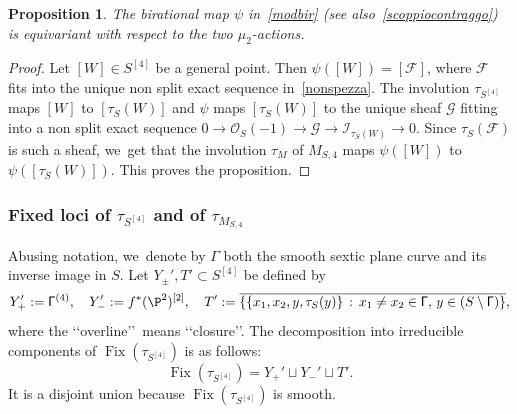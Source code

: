 \documentclass[JEP,XML,SOM,Unicode,published]{cedram}
\newcommand\cF{\mathcal{F}}
\newcommand\cG{\mathcal{G}}
\newcommand\cI{\mathcal{I}}
\newcommand\cO{\mathcal{O}}
\DeclareMathOperator{\Fix}{Fix}
\let\ov\overline
\newtheorem{prop}[lemm]{Proposition}
\theoremstyle{definition}
\begin{document}
\begin{prop}\label{prop:azionicompat}
The birational map $\psi$ in~\eqref{modbir} (see also~\eqref{scoppiocontraggo}) is equivariant with respect to the two $\mu_2$-actions.
\end{prop}

\begin{proof}
Let $[W]\in S^{[4]}$ be a general point. Then $\psi([W])=[\cF]$, where $\cF$ fits into the unique non split exact sequence in~\eqref{nonspezza}. The involution $\tau_{S^{[4]}}$ maps $[W]$ to $[\tau_S(W)]$ and $\psi$ maps $[\tau_S(W)]$ to the unique sheaf $\cG$ fitting into a non split exact sequence $0\to\cO_S(-1)\to\cG\to \cI_{\tau_S(W)}\to 0$. Since $\tau_S(\cF)$ is such a sheaf, we~get that the involution $\tau_M$ of $M_{S,4}$ maps $\psi([W])$ to $\psi([\tau_S(W)])$. This proves the proposition.
\end{proof}

\subsubsection*{Fixed loci of $\tau_{S^{[4]}}$ and of $\tau_{M_{S,4}}$}

Abusing notation, we~denote by $\mathsf{\Gamma}$ both the smooth sextic plane curve and its inverse image in $S$.
Let $Y_{\pm}',T'\subset S^{[4]}$ be defined by
\begin{equation*}
Y_+':=\mathsf{\Gamma}^{(4)},\quad Y_-':=f^*(\P^2)^{[2]},\quad
T':=\ov{\{\{x_1,x_2,y,\tau_S(y)\} \,:\, x_1\not= x_2\in
\mathsf{\Gamma},\, y\in(S\setminus\mathsf{\Gamma})\}},
\end{equation*}
where the \lq\lq overline\rq\rq\ means \lq\lq closure\rq\rq.
The decomposition into irreducible components of $\Fix(\tau_{S^{[4]}})$ is as follows:
\begin{equation*}
\Fix(\tau_{S^{[4]}})=Y_+'\sqcup Y_-'\sqcup T'.
\end{equation*}
It is a disjoint union because $\Fix(\tau_{S^{[4]}})$ is smooth.
\end{document}
